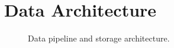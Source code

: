 \section{Data Architecture}

\lipsum[1]

\begin{figure}[H]
	\centering
	\caption{Data pipeline and storage architecture.}
	\label{fig:data-pipeline}
\end{figure}
